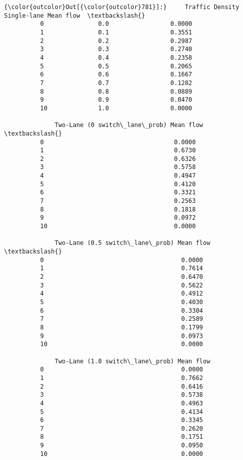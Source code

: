 \documentclass[11pt]{article}
\begin{document}
\begin{Verbatim}[commandchars=\\\{\}]
{\color{outcolor}Out[{\color{outcolor}781}]:}     Traffic Density  Single-lane Mean flow  \textbackslash{}
          0               0.0                 0.0000   
          1               0.1                 0.3551   
          2               0.2                 0.2987   
          3               0.3                 0.2740   
          4               0.4                 0.2358   
          5               0.5                 0.2065   
          6               0.6                 0.1667   
          7               0.7                 0.1282   
          8               0.8                 0.0889   
          9               0.9                 0.0470   
          10              1.0                 0.0000   
          
              Two-Lane (0 switch\_lane\_prob) Mean flow  \textbackslash{}
          0                                    0.0000   
          1                                    0.6730   
          2                                    0.6326   
          3                                    0.5758   
          4                                    0.4947   
          5                                    0.4120   
          6                                    0.3321   
          7                                    0.2563   
          8                                    0.1818   
          9                                    0.0972   
          10                                   0.0000   
          
              Two-Lane (0.5 switch\_lane\_prob) Mean flow  \textbackslash{}
          0                                      0.0000   
          1                                      0.7614   
          2                                      0.6470   
          3                                      0.5622   
          4                                      0.4912   
          5                                      0.4030   
          6                                      0.3304   
          7                                      0.2589   
          8                                      0.1799   
          9                                      0.0973   
          10                                     0.0000   
          
              Two-Lane (1.0 switch\_lane\_prob) Mean flow  
          0                                      0.0000  
          1                                      0.7662  
          2                                      0.6416  
          3                                      0.5738  
          4                                      0.4963  
          5                                      0.4134  
          6                                      0.3345  
          7                                      0.2620  
          8                                      0.1751  
          9                                      0.0950  
          10                                     0.0000  
\end{Verbatim}
            
\end{document}
